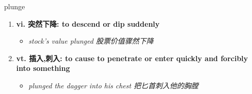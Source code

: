 
\begin{frame}
{\huge plunge}
\begin{center}
\begin{enumerate}\Large
  \item \textbf{vi. 突然下降: to descend or dip suddenly}
  \begin{itemize}
    \item \em{\Large{stock’s value plunged 股票价值骤然下降}}
  \end{itemize}
  \item \textbf{vt. 插入,刺入: to cause to penetrate or enter quickly and forcibly into something}
  \begin{itemize}
    \item \em{\Large{plunged the dagger into his chest 把匕首刺入他的胸膛}}
  \end{itemize}
\end{enumerate}
\end{center}
\end{frame}
